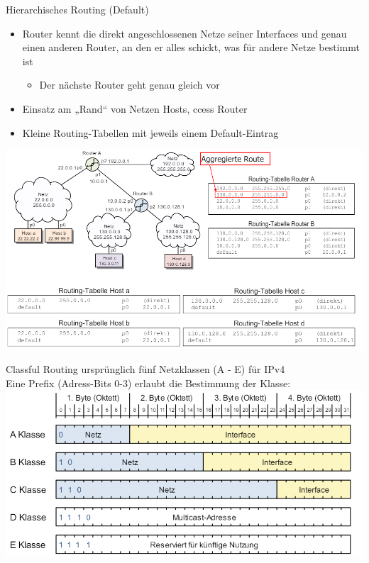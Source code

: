 \begin{concept}{Hierarchisches Routing (Default)}
    \begin{itemize}
        \item Router kennt die direkt angeschlossenen Netze seiner Interfaces und genau einen anderen Router, an den er alles schickt, was für andere Netze bestimmt ist
        \begin{itemize}
            \item Der nächste Router geht genau gleich vor
        \end{itemize}
        \item Einsatz am „Rand“ von Netzen Hosts, ccess Router
        \item Kleine Routing-Tabellen mit jeweils einem Default-Eintrag
    \end{itemize}
        \includegraphics[width=1\linewidth]{images/hierarchisches_routing.png}
\end{concept}

\begin{concept}{Classful Routing}
    ursprünglich fünf Netzklassen (A - E) für IPv4\\
    Eine Prefix (Adress-Bits 0-3) erlaubt die Bestimmung der Klasse:\\
        \includegraphics[width=0.9\linewidth]{images/classfulrouitng.png}
\end{concept}

